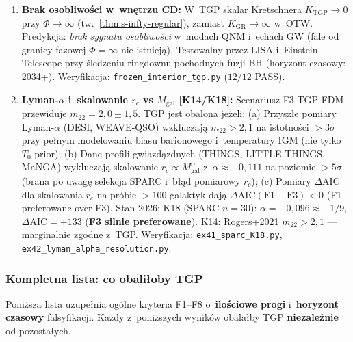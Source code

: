 \begin{enumerate}[label=\textbf{F\arabic*}., nosep]
  \item \textbf{Brak osobliwo\'sci w~wnętrzu CD:}
        W~TGP skalar Kretschnera $K_{\mathrm{TGP}} \to 0$
        przy $\Phi \to \infty$ (tw.~\ref{thm:s-infty-regular}),
        zamiast $K_{\mathrm{GR}} \to \infty$ w~OTW.
        Predykcja: \emph{brak sygnatu osobliwo\'sci} w~modach QNM
        i~echach GW (fale od granicy fazowej $\Phi = \infty$ nie istniej\k{a}).
        Testowalny przez LISA i~Einstein Telescope przy \'sledzeniu
        ringdownu pochodnych fuzji BH (horyzont czasowy: 2034+).
        Weryfikacja: \texttt{frozen\_interior\_tgp.py} ($12/12$ PASS).

  \item \textbf{Lyman-$\alpha$ i~skalowanie $r_c$ vs $M_{\mathrm{gal}}$
        [K14/K18]:}
        Scenariusz F3 TGP-FDM przewiduje $m_{22} = 2{,}0 \pm 1{,}5$.
        TGP jest obalona je\.zeli:
        (a) Przysz\l{}e pomiary Lyman-$\alpha$ (DESI, WEAVE-QSO)
            wzkluczaj\k{a} $m_{22} > 2{,}1$ na istotno\'sci $> 3\sigma$
            przy pe\l{}nym modelowaniu biasu barionowego
            i~temperatury IGM (nie tylko $T_0$-prior);
        (b) Dane profili gwiazd\k{a}zdnych (THINGS, LITTLE THINGS, MaNGA)
            wykluczaj\k{a} skalowanie
            $r_c \propto M_{\mathrm{gal}}^{\alpha}$
            z~$\alpha \approx -0{,}111$ na poziomie $> 5\sigma$
            (brana po uwag\k{e} selekcja SPARC i~b\l{}\k{a}d pomiarowy $r_c$);
        (c) Pomiary $\Delta\mathrm{AIC}$ dla skalowania $r_c$ na pr\'obie
            $> 100$ galaktyk daj\k{a} $\Delta\mathrm{AIC}(\mathrm{F1-F3}) < 0$
            (F1 preferowane over F3).
        Stan 2026: K18 (SPARC $n=30$): $\alpha=-0{,}096\approx -1/9$,
        $\Delta\mathrm{AIC}=+133$ (\textbf{F3 silnie preferowane}).
        K14: Rogers+2021 $m_{22}>2{,}1$ --- marginalnie zgodne z~TGP.
        Weryfikacja: \texttt{ex41\_sparc\_K18.py},
        \texttt{ex42\_lyman\_alpha\_resolution.py}.
\end{enumerate}

\subsubsection{Kompletna lista: co obali\l{}oby TGP}%
\label{ssec:kill-shots}

Poni\.zsza lista uzupe\l{}nia og\'olne kryteria F1--F8 o~\textbf{ilo\'sciowe
progi} i~\textbf{horyzont czasowy} falsyfikacji.
Ka\.zdy z~poni\.zszych wynik\'ow obala\l{}by TGP \textbf{niezale\.znie}
od pozosta\l{}ych.

